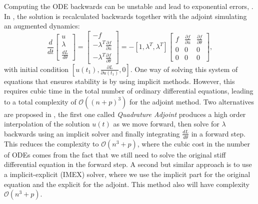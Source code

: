 Computing the ODE backwards can be unstable and lead to exponential errors, \cite{kim_stiff_2021}. 
In \cite{chen_neural_2019}, the solution is recalculated backwards together with the adjoint simulating an augmented dynamics: 
\begin{equation}
    \frac{d}{dt}
    \begin{bmatrix}
       u \\
       \lambda \\
       \frac{dL}{d\theta}
    \end{bmatrix}
    = 
    \begin{bmatrix}
       -f \\
       - \lambda^T \frac{\partial f}{\partial u} \\
       - \lambda^T \frac{\partial f}{\partial \theta}
    \end{bmatrix}
    = 
    - [ 1, \lambda^T, \lambda^T ]
    \begin{bmatrix}
       f & \frac{\partial f}{\partial u} & \frac{\partial f}{\partial \theta} \\
       0 & 0 & 0 \\
       0 & 0 & 0
    \end{bmatrix},
\end{equation}
with initial condition $[u(t_1), \frac{\partial L}{\partial u(t_1)}, 0]$. One way of solving this system of equations that ensures stability is by using implicit methods. However, this requires cubic time in the total number of ordinary differential equations, leading to a total complexity of $\mathcal O((n+p)^3)$ for the adjoint method. Two alternatives are proposed in \cite{kim_stiff_2021}, the first one called \textit{Quadrature Adjoint} produces a high order interpolation of the solution $u(t)$ as we move forward, then solve for $\lambda$ backwards using an implicit solver and finally integrating $\frac{dL}{d\theta}$ in a forward step. This reduces the complexity to $\mathcal O (n^3 + p)$, where the cubic cost in the number of ODEs comes from the fact that we still need to solve the original stiff differential equation in the forward step. A second but similar approach is to use a implicit-explicit (IMEX) solver, where we use the implicit part for the original equation and the explicit for the adjoint. This method also will have complexity $\mathcal O (n^3 + p)$.